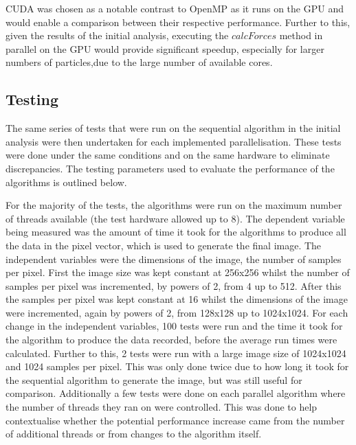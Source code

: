 \documentclass[12pt,journal,transmag]{IEEEtran}
\begin{document}
	
	
	CUDA was chosen as a notable contrast to OpenMP as it runs on the GPU and would enable a comparison between their respective performance. Further to this, given the results of the initial analysis, executing the $calcForces$ method in parallel on the GPU would provide significant speedup, especially for larger numbers of particles,due to the large number of available cores.
	
	\subsection{Testing}
	The same series of tests that were run on the sequential algorithm in the initial analysis were then undertaken for each implemented parallelisation. These tests were done under the same conditions and on the same hardware to eliminate discrepancies. The testing parameters used to evaluate the performance of the algorithms is outlined below.
	
	For the majority of the tests, the algorithms were run on the maximum number of threads available (the test hardware allowed up to 8). The dependent variable being measured was the amount of time it took for the algorithms to produce all the data in the pixel vector, which is used to generate the final image. The independent variables were the dimensions of the image, the number of samples per pixel. First the image size was kept constant at 256x256 whilst the number of samples per pixel was incremented, by powers of 2, from 4 up to 512. After this the samples per pixel was kept constant at 16 whilst the dimensions of the image were incremented, again by powers of 2, from 128x128 up to 1024x1024. For each change in the independent variables, 100 tests were run and the time it took for the algorithm to produce the data recorded, before the average run times were calculated. Further to this, 2 tests were run with a large image size of 1024x1024 and 1024 samples per pixel. This was only done twice due to how long it took for the sequential algorithm to generate the image, but was still useful for comparison. Additionally a few tests were done on each parallel algorithm where the number of threads they ran on were controlled. This was done to help contextualise whether the potential performance increase came from the number of additional threads or from changes to the algorithm itself.
	
\end{document}
